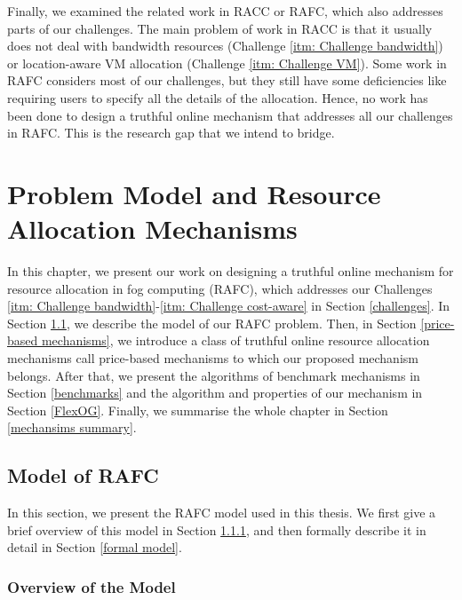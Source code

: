 \documentclass[11pt]{phdthesis}
\begin{document}
Finally, we examined the related work in RACC or RAFC, which also addresses parts of our challenges. The main problem of work in RACC is that it usually does not deal with bandwidth resources (Challenge \ref{itm: Challenge bandwidth}) or location-aware VM allocation (Challenge \ref{itm: Challenge VM}). Some work in RAFC considers most of our challenges, but they still have some deficiencies like requiring users to specify all the details of the allocation. Hence, no work has been done to design a truthful online mechanism that addresses all our challenges in RAFC. This is the research gap that we intend to bridge.


\chapter{Problem Model and Resource Allocation Mechanisms} \label{our mechanism}

In this chapter, we present our work on designing a truthful online mechanism for resource allocation in fog computing (RAFC), which addresses our Challenges \ref{itm: Challenge bandwidth}-\ref{itm: Challenge cost-aware} in Section \ref{challenges}. In Section \ref{model of fog}, we describe the model of our RAFC problem. Then, in Section \ref{price-based mechanisms}, we introduce a class of truthful online resource allocation mechanisms call price-based mechanisms to which our proposed mechanism belongs. After that, we present the algorithms of benchmark mechanisms in Section \ref{benchmarks} and the algorithm and properties of our mechanism in Section \ref{FlexOG}. Finally, we summarise the whole chapter in Section \ref{mechansims summary}. 

\section{Model of RAFC} \label{model of fog}

In this section, we present the RAFC model used in this thesis. We first give a brief overview of this model in Section \ref{overview of the model}, and then formally describe it in detail in Section \ref{formal model}. 


\subsection{Overview of the Model} \label{overview of the model}
\end{document}
